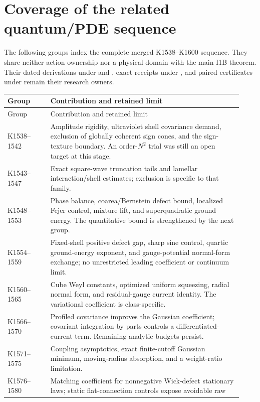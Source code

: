 \section{Coverage of the related quantum/PDE sequence}
\label{app:quantum-map}
The following groups index the complete merged K1538--K1600 sequence.
They share neither action ownership nor a physical domain with the main
I1B theorem. Their dated derivations under  and
, exact receipts under
, and paired certificates under
 remain their research owners.
\begingroup\small
\begin{longtable}{>{\raggedright\arraybackslash}p{0.17\linewidth}>{\raggedright\arraybackslash}p{0.76\linewidth}}
\toprule
Group & Contribution and retained limit\\\midrule\endfirsthead
\toprule Group & Contribution and retained limit\\\midrule\endhead
\bottomrule\endfoot
K1538--1542 & Amplitude rigidity, ultraviolet shell covariance demand,
exclusion of globally coherent sign cones, and the sign-texture boundary.
An order-$N^2$ trial was still an open target at this stage.\\
K1543--1547 & Exact square-wave truncation tails and lamellar
interaction/shell estimates; exclusion is specific to that family.\\
K1548--1553 & Phase balance, coarea/Bernstein defect bound,
localized Fejer control, mixture lift, and superquadratic ground energy.
The quantitative bound is strengthened by the next group.\\
K1554--1559 & Fixed-shell positive defect gap, sharp sine control,
quartic ground-energy exponent, and gauge-potential normal-form exchange;
no unrestricted leading coefficient or continuum limit.\\
K1560--1565 & Cube Weyl constants, optimized uniform squeezing,
radial normal form, and residual-gauge current identity. The variational
coefficient is class-specific.\\
K1566--1570 & Profiled covariance improves the Gaussian coefficient;
covariant integration by parts controls a differentiated-current term.
Remaining analytic budgets persist.\\
K1571--1575 & Coupling asymptotics, exact finite-cutoff Gaussian
minimum, moving-radius absorption, and a weight-ratio limitation.\\
K1576--1580 & Matching coefficient for nonnegative Wick-defect
stationary laws; static flat-connection controls expose avoidable raw

\end{longtable}
